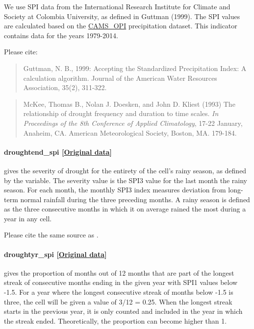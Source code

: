 \documentclass[]{book}
\begin{document}
We use SPI data from the International Research Institute for Climate
and Society at Colombia University, as defined in Guttman (1999). The
SPI values are calculated based on the
\href{http://www.cpc.ncep.noaa.gov/products/global_precip/html/wpage.cams_opi.html}{CAMS\_OPI}
precipitation dataset. This indicator contains data for the years
1979-2014.

Please cite:

\begin{quote}
Guttman, N. B., 1999: Accepting the Standardized Precipitation Index: A
calculation algorithm. Journal of the American Water Resources
Association, 35(2), 311-322.
\end{quote}

\begin{quote}
McKee, Thomas B., Nolan J. Doesken, and John D. Kliest (1993) The
relationship of drought frequency and duration to time scales. \emph{In
Proceedings of the 8th Conference of Applied Climatology}, 17-22
January, Anaheim, CA. American Meteorological Society, Boston, MA.
179-184.
\end{quote}

\paragraph{droughtend\_spi
{[}\href{http://iridl.ldeo.columbia.edu/maproom/Global/Precipitation/SPI.html}{Original
data}{]}}\label{droughtend-spi}

gives the severity of drought for the entirety of the cell's rainy
season, as defined by the  variable. The severity value
is the SPI3 value for the last month the rainy season. For each month,
the monthly SPI3 index measures deviation from long-term normal rainfall
during the three preceding months. A rainy season is defined as the
three consecutive months in which it on average rained the most during a
year in any cell.

Please cite the same source as .

\paragraph{droughtyr\_spi
{[}\href{http://iridl.ldeo.columbia.edu/maproom/Global/Precipitation/SPI.html}{Original
data}{]}}\label{droughtyr-spi}

gives the proportion of months out of 12 months that are part of the
longest streak of consecutive months ending in the given year with SPI1
values below -1.5. For a year where the longest consecutive streak of
months below -1.5 is three, the cell will be given a value of 3/12 =
0.25. When the longest streak starts in the previous year, it is only
counted and included in the year in which the streak ended.
Theoretically, the proportion can become higher than 1.
\end{document}
